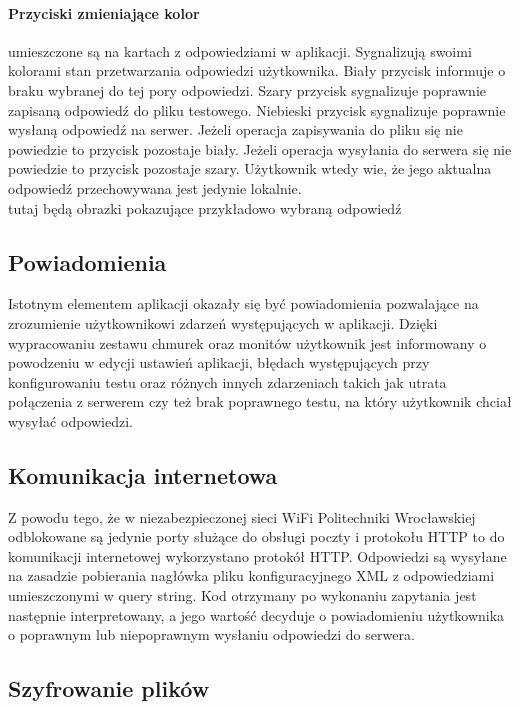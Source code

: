 \documentclass{report}
\begin{document}
				\paragraph{Przyciski zmieniające kolor}
				umieszczone są na kartach z odpowiedziami w aplikacji. Sygnalizują swoimi kolorami stan przetwarzania odpowiedzi użytkownika. Biały przycisk informuje o braku wybranej do tej pory odpowiedzi. Szary przycisk sygnalizuje poprawnie zapisaną odpowiedź do pliku testowego. Niebieski przycisk sygnalizuje poprawnie wysłaną odpowiedź na serwer.
				Jeżeli operacja zapisywania do pliku się nie powiedzie to przycisk pozostaje biały.
				Jeżeli operacja wysyłania do serwera się nie powiedzie to przycisk pozostaje szary. Użytkownik wtedy wie, że jego aktualna odpowiedź przechowywana jest jedynie lokalnie.\\
				
				tutaj będą obrazki pokazujące przykładowo wybraną odpowiedź\\
				
			\subsection{Powiadomienia}
		
			Istotnym elementem aplikacji okazały się być powiadomienia pozwalające na zrozumienie użytkownikowi zdarzeń występujących w aplikacji. Dzięki wypracowaniu zestawu chmurek oraz monitów użytkownik jest informowany o powodzeniu w edycji ustawień aplikacji, błędach występujących przy konfigurowaniu testu oraz różnych innych zdarzeniach takich jak utrata połączenia z serwerem czy też brak poprawnego testu, na który użytkownik chciał wysyłać odpowiedzi.
			
			\subsection{Komunikacja internetowa}
			
			Z powodu tego, że w niezabezpieczonej sieci WiFi Politechniki Wrocławskiej odblokowane są jedynie porty służące do obsługi poczty i protokołu HTTP to do komunikacji internetowej wykorzystano protokół HTTP. Odpowiedzi są wysyłane na zasadzie pobierania nagłówka pliku konfiguracyjnego XML z odpowiedziami umieszczonymi w query string. Kod otrzymany po wykonaniu zapytania jest następnie interpretowany, a jego wartość decyduje o powiadomieniu użytkownika o poprawnym lub niepoprawnym wysłaniu odpowiedzi do serwera.
		
			\subsection{Szyfrowanie plików}
		
\end{document}

